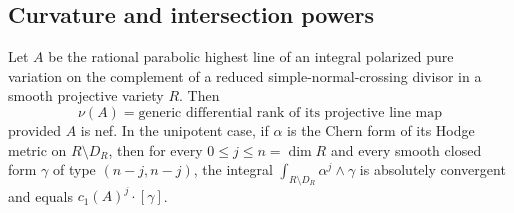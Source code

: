 \subsection{Curvature and intersection powers}

\begin{lemma}\label{p1varhd:curvature}
Let $A$ be the rational parabolic highest line of an integral
polarized pure variation on the complement of a reduced
simple-normal-crossing divisor in a smooth projective variety $R$.
Then
\begin{equation}\label{p1varhd:numrank}
 \nu(A)=\text{generic differential rank of its projective line map}
\end{equation}
provided $A$ is nef.  In the unipotent case, if $\alpha$ is the Chern
form of its Hodge metric on $R\setminus D_R$, then for every
$0\leq j\leq n=\dim R$ and every smooth closed form $\gamma$ of type
$(n-j,n-j)$, the integral
$\int_{R\setminus D_R}\alpha^j\wedge\gamma$ is absolutely convergent
and equals $c_1(A)^j\cdot[\gamma]$.
\end{lemma}

